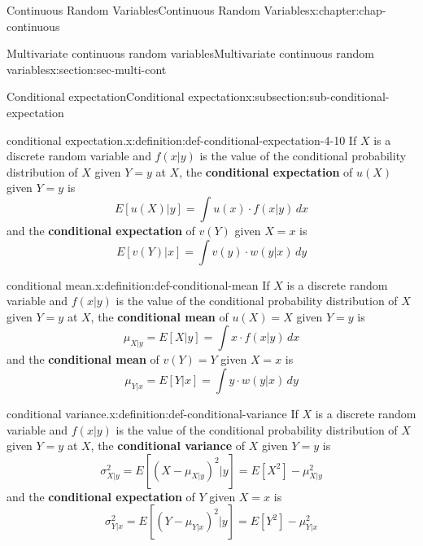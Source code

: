 \documentclass[oneside,10pt,]{book}
\newcommand{\terminology}[1]{\textbf{#1}}
\begin{document}
\begin{chapterptx}{Continuous Random Variables}{}{Continuous Random Variables}{}{}{x:chapter:chap-continuous}
\begin{sectionptx}{Multivariate continuous random variables}{}{Multivariate continuous random variables}{}{}{x:section:sec-multi-cont}
\begin{subsectionptx}{Conditional expectation}{}{Conditional expectation}{}{}{x:subsection:sub-conditional-expectation}
\begin{definition}{conditional expectation.}{x:definition:def-conditional-expectation-4-10}
If \(X\) is a discrete random variable and \(\displaystyle f(x|y)\) is the value of the conditional probability distribution of \(X\) given \(\displaystyle Y = y\) at \(X\), the \terminology{conditional expectation} of \(\displaystyle u(X)\) given \(\displaystyle Y = y\) is%
\begin{equation*}
E[u(X)|y] = \int u(x)\cdot f(x|y)\,dx
\end{equation*}
and the \terminology{conditional expectation} of \(\displaystyle v(Y)\) given \(\displaystyle X
= x\) is%
\begin{equation*}
E[v(Y)|x] = \int v(y)\cdot w(y|x)\,dy
\end{equation*}
%
\end{definition}
\begin{definition}{conditional mean.}{x:definition:def-conditional-mean}%
If \(X\) is a discrete random variable and \(\displaystyle f(x|y)\) is the value of the conditional probability distribution of \(X\) given \(\displaystyle Y = y\) at \(X\), the \terminology{conditional mean} of \(\displaystyle u(X) = X\) given \(\displaystyle Y = y\) is%
\begin{equation*}
\mu_{X|y} = E[X|y] = \int x\cdot f(x|y)\,dx
\end{equation*}
and the \terminology{conditional mean} of \(\displaystyle v(Y) = Y\) given \(\displaystyle X = x\) is%
\begin{equation*}
\displaystyle \mu_{Y|x} = E[Y|x] = \int y\cdot w(y|x)\,dy
\end{equation*}
%
\end{definition}
\begin{definition}{conditional variance.}{x:definition:def-conditional-variance}%
If \(X\) is a discrete random variable and \(\displaystyle f(x|y)\) is the value of the conditional probability distribution of \(X\) given \(\displaystyle Y = y\) at \(X\), the \terminology{conditional variance} of \(X\) given \(\displaystyle Y = y\) is%
\begin{equation*}
\sigma^2_{X|y} = E[(X-\mu_{X|y})^2|y] = E[X^2]-\mu^2_{X|y}
\end{equation*}
and the \terminology{conditional expectation} of \(Y\) given \(\displaystyle X = x\) is%
\begin{equation*}
\displaystyle\sigma^2_{Y|x} = E[(Y-\mu_{Y|x})^2|y] =
E[Y^2]-\mu^2_{Y|x}
\end{equation*}
%
\end{definition}
\end{subsectionptx}
\end{sectionptx}
\end{chapterptx}
\end{document}
